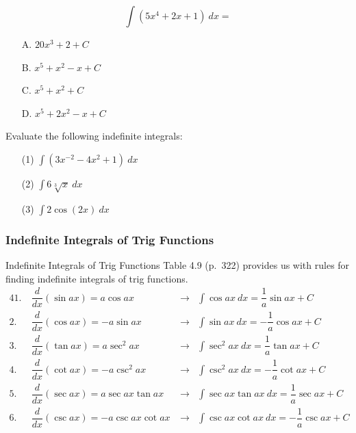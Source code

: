 \documentclass[cal1spr16Lectures.tex]{subfiles}
\begin{document}
\begin{frame}
\begin{exe}
\[\int(5x^4+2x+1)\ dx=\]
\begin{itemize}
\item[A. ] $20x^3+2+C$
\item[B. ] $x^5+x^2-x+C$
\item[C. ] $x^5+x^2+C$
\item[D. ] $x^5+2x^2-x+C$
\end{itemize}
\end{exe}
\end{frame}

\begin{frame}
\begin{exe} Evaluate the following indefinite integrals:
\begin{itemize}
\item[(1) ] $\int \left( 3x^{-2}-4x^2+1 \right)\ dx$
\item[(2) ] $\int 6 \sqrt[3]{x}\ dx$
\item[(3) ] $\int 2 \cos{(2x)}\ dx$
\end{itemize}
\end{exe}
\end{frame}

\subsubsection{Indefinite Integrals of Trig Functions}

\begin{frame}{\small Indefinite Integrals of Trig Functions}\footnotesize
Table 4.9 (p.\ 322) provides us with rules for finding indefinite integrals of trig functions.
\begin{alignat*}{4}
1.\ &\dfrac{d}{dx} (\sin ax) = a\cos ax &\longrightarrow &\int \cos ax\ dx = \dfrac{1}{a} \sin ax + C \\
2.\ &\dfrac{d}{dx} (\cos ax) = -a\sin ax &\longrightarrow &\int \sin ax\ dx = -\dfrac{1}{a} \cos ax + C \\
3.\ &\dfrac{d}{dx} (\tan ax) = a\sec^2 ax &\longrightarrow &\int \sec^2 ax\ dx = \dfrac{1}{a} \tan ax + C \\
4.\ &\dfrac{d}{dx} (\cot ax) = -a\csc^2 ax &\longrightarrow &\int \csc^2 ax\ dx = -\dfrac{1}{a} \cot ax + C \\
5.\ &\dfrac{d}{dx} (\sec ax) = a\sec ax \tan ax &\longrightarrow &\int \sec ax \tan ax\ dx = \dfrac{1}{a} \sec ax + C \\
6.\ &\dfrac{d}{dx} (\csc ax) = -a\csc ax \cot ax \ &\longrightarrow &\int \csc ax \cot ax\ dx = -\dfrac{1}{a} \csc ax + C
\end{alignat*}
\end{frame}
\end{document}
